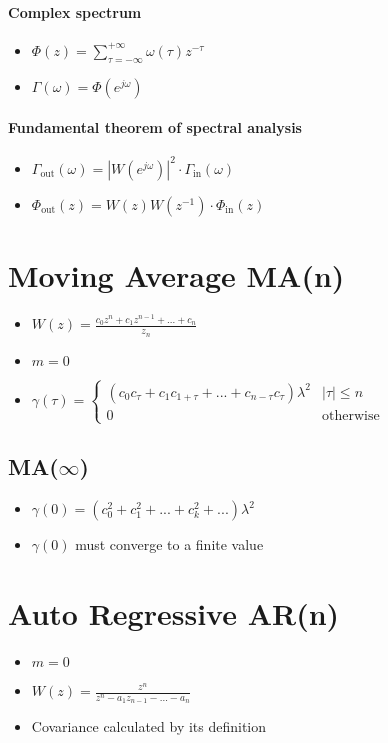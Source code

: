 \documentclass{article}
\begin{document}
\paragraph{Complex spectrum}
\begin{itemize}
\item $\Phi(z)=\sum_{\tau =-\infty}^{+\infty} \omega(\tau)z^{-\tau}$
\item $\Gamma(\omega)=\Phi(e^{j\omega})$
\end{itemize}
\paragraph{Fundamental theorem of spectral analysis}
\begin{itemize}
\item $\Gamma_{\text{out}}(\omega)=|W(e^{j\omega})|^2 \cdot \Gamma_{\text{in}}(\omega)$
\item $\Phi_{\text{out}}(z)=W(z)W(z^{-1}) \cdot \Phi_{\text{in}}(z)$
\end{itemize}
\section{Moving Average MA(n)}
\begin{itemize}
\item $W(z)=\frac{c_0z^n+c_1z^{n-1}+...+c_n}{z_n}$
\item $m=0$
\item $\gamma(\tau)= 
\begin{cases}
(c_0c_\tau+c_1c_{1+\tau}+...+c_{n-\tau}c_\tau)\lambda^2	&	|\tau|\leq n\\
0	& \text{otherwise}
\end{cases}$
\end{itemize}
\subsection{MA($\infty$)}
\begin{itemize}
\item $\gamma(0)=(c_0^2+c_1^2+...+c_k^2+...)\lambda^2$
\item $\gamma(0)$ must converge to a finite value
\end{itemize}
\section{Auto Regressive AR(n)}
\begin{itemize}
\item $m=0$
\item $W(z)=\frac{z^n}{z^n-a_1z_{n-1}-...-a_n}$
\item Covariance calculated by its definition
\end{itemize}
\end{document}

